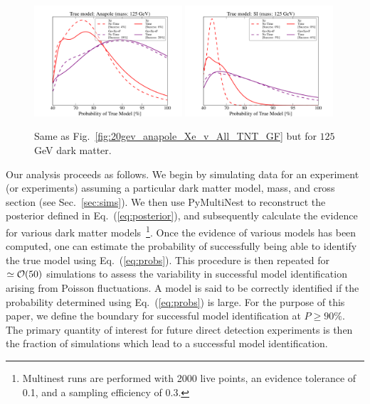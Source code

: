 \documentclass[11pt]{article}
\newcommand{\Eq}[1]{Eq.~(\ref{#1})} \newcommand{\Eqs}[2]{Eqs.~(\ref{#1}) and (\ref{#2})} \newcommand{\Eqm}[2]{Eqs.~(\ref{#1}) through (\ref{#2})}
\begin{document}
\begin{figure}
\centering
\includegraphics[width=0.49\textwidth, trim=1.cm 0.0cm 1.cm 0.4cm,clip=true]{plots/PDF_Single_125GeV_Anapole_50sims_Xe_vs_FGeXe_GF_TNT.pdf}
\includegraphics[width=0.49\textwidth, trim=1.cm 0.cm 1.cm 0.4cm,clip=true]{plots/PDF_Single_125GeV_SI_Higgs_50sims_Xe_vs_FGeXe_GF_TNT.pdf}
\caption{\label{fig:125gev_anapole_Xe_v_All_TNT_GF}
Same as Fig.~\ref{fig:20gev_anapole_Xe_v_All_TNT_GF} but for $125$ GeV dark matter.}
\end{figure}

Our analysis proceeds as follows. We begin by simulating data for an experiment (or experiments) assuming a particular dark matter model, mass, and cross section (see Sec.~\ref{sec:sims}). We then use PyMultiNest to reconstruct the posterior defined in \Eq{eq:posterior}, and subsequently calculate the evidence for various dark matter models~\cite{pymultinest,Feroz:2008xx}\footnote{Multinest runs are performed with 2000 live points, an evidence tolerance of 0.1, and a sampling efficiency of 0.3.}. Once the evidence of various models has been computed, one can estimate the probability of successfully being able to identify the true model using \Eq{eq:probs}. This procedure is then repeated for $\simeq {\cal O}(50)$ simulations to assess the variability in successful model identification arising from Poisson fluctuations. A model is said to be correctly identified if the probability determined using \Eq{eq:probs} is large. For the purpose of this paper, we define the boundary for successful model identification at $P \geq 90\%$. The primary quantity of interest for future direct detection experiments is then the fraction of simulations which lead to a successful model identification.    
\end{document}
